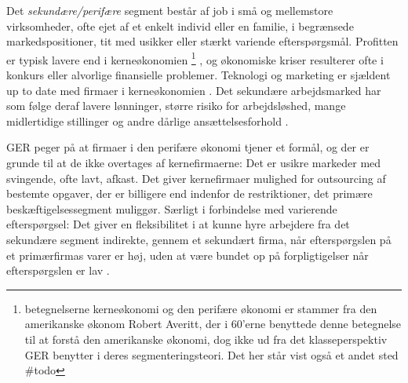 Det \emph{sekundære/perifære} segment består af job i små og mellemstore virksomheder, ofte ejet af et enkelt individ eller en familie, i begrænsede markedspositioner, tit med usikker eller stærkt variende efterspørgsmål. Profitten er typisk lavere end i kerneøkonomien%
%
\footnote{betegnelserne kerneøkonomi og den perifære økonomi er stammer fra den amerikanske økonom Robert Averitt, der i 60'erne benyttede denne betegnelse til at forstå den amerikanske økonomi, dog ikke ud fra det klasseperspektiv GER benytter i deres segmenteringsteori. Det her står vist også et andet sted \#todo}%
%
, og økonomiske kriser resulterer ofte i konkurs eller alvorlige finansielle problemer. Teknologi og marketing er sjældent up to date med firmaer i kerneøkonomien \parencite[7]{Averitt1968}. Det sekundære arbejdsmarked har som følge deraf lavere lønninger, større risiko for arbejdsløshed, mange midlertidige  stillinger og andre dårlige ansættelsesforhold \parencite[70f]{Doeringer1971}.

GER peger på at firmaer i den perifære økonomi tjener et formål, og der er grunde til at de ikke overtages af kernefirmaerne: Det er usikre markeder med svingende, ofte lavt, afkast. Det giver kernefirmaer mulighed for outsourcing af bestemte opgaver, der er billigere end indenfor de restriktioner, det primære beskæftigelsessegment muliggør. Særligt i forbindelse med varierende efterspørgsel: Det giver en fleksibilitet i at kunne hyre arbejdere fra det sekundære segment indirekte, gennem et sekundært firma, når efterspørgslen på et primærfirmas varer er høj, uden at være bundet op på forpligtigelser når efterspørgslen er lav \parencite[191]{Gordon1982}. 

